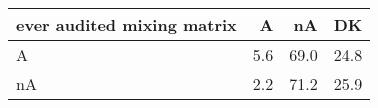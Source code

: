 \begin{table}[ht]
\centering
\begin{tabular}{lrrr}
  \hline
ever audited mixing matrix & A & nA & DK \\ 
  \hline
A & 5.6 & 69.0 & 24.8 \\ 
  nA & 2.2 & 71.2 & 25.9 \\ 
   \hline
\end{tabular}
\end{table}
